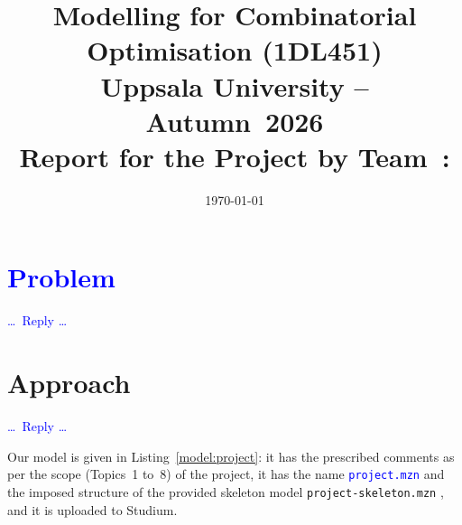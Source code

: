 \documentclass[a4paper,11pt,hidelinks]{article}
\title{\textbf{Modelling for Combinatorial Optimisation (1DL451) \\
    Uppsala University -- Autumn~2026
    \\
    Report for the Project
    by Team~\todo{t}: \\                      %
    \Problem
  }
}
\author{\todo{Clara CLÄVER and Whiz KIDD}}
\date{\today}
\renewcommand{\todo}[1]{\textcolor{blue}{#1}} %
\newcommand{\Problem}{\todo{Problem}\xspace}  %
\begin{document}
\maketitle


\section{\Problem}


\todo{\dots\ Reply \dots}


\section{Approach}


\todo{\dots\ Reply \dots}

Our model is given in Listing~\ref{model:project}: it has the
prescribed comments as per the scope (Topics~1 to~8) of the project,
it has the name \todo{\texttt{project.mzn}}             %
and the imposed structure of the provided skeleton model
\texttt{project-skeleton.mzn}%
, and it is uploaded to Studium.

\end{document}
